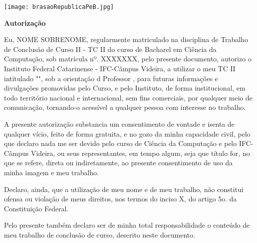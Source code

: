 \begin{folhadeautorizacao}

  \begin{center}
  \vspace*{1 cm}
  \vspace{-2cm}
   \centering\texttt{[image: brasaoRepublicaPeB.jpg]}
   \vspace{-0.5 cm}
    {\large \SingleSpacing \imprimirinstituicao}
    \vspace{-0.5cm}
    \center{ \hrulefill}
    
     {\large \SingleSpacing \textbf{Autorização}}
    
    
    \vspace*{1 cm}
    
    \vspace*{0.5 cm}
    
   \end{center}
   


Eu, NOME SOBRENOME, regularmente matriculado na disciplina de Trabalho de Conclusão de Curso II - TC II do curso de Bacharel em Ciência da Computação, sob matrícula nº. XXXXXXX, pelo presente documento, autorizo o Instituto Federal Catarinense - IFC-Câmpus Videira, a utilizar o meu TC II intitulado "\imprimirtitulo", sob a orientação d Professor \imprimirorientador, para futuras informações e divulgações promovidas pelo Curso, e pelo Instituto, de forma institucional, em todo território nacional e internacional, sem fins comerciais, por qualquer meio de comunicação, tornando-o acessível a qualquer pessoa com interesse no trabalho.

A presente autorização substancia um consentimento de vontade e isenta de qualquer vício, feito de forma gratuita, e no gozo da minha capacidade civil, pelo que declaro nada me ser devido pelo curso de Ciência da Computação e pelo IFC-Câmpus Videira, ou seus representantes, em tempo algum, seja que título for, no que se refere, direta ou indiretamente, ao presente consentimento de uso da minha imagem e meu trabalho.

Declaro, ainda, que a utilização de meu nome e de meu trabalho, não constitui ofensa ou violação de meus direitos, nos termos do inciso X, do artigo 5o. da Constituição Federal.

Pelo presente também declaro ser de minha total responsabilidade o conteúdo de meu trabalho de conclusão de curso, descrito neste documento.


\end{folhadeautorizacao}
